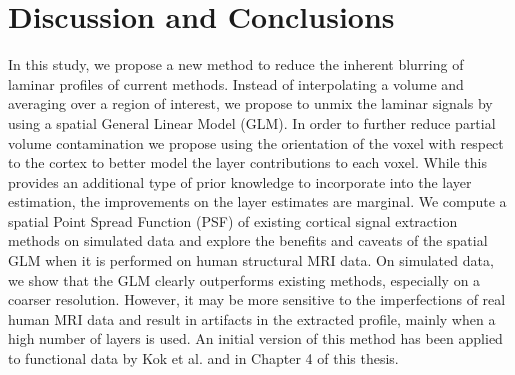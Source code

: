 \section{Discussion and Conclusions}
In this study, we propose a new method to reduce the inherent blurring of laminar profiles of current methods. Instead of interpolating a volume and averaging over a region of interest, we propose to unmix the laminar signals by using a spatial General Linear Model (GLM). In order to further reduce partial volume contamination we propose using the orientation of the voxel with respect to the cortex to better model the layer contributions to each voxel. While this provides an additional type of prior knowledge to incorporate into the layer estimation, the improvements on the layer estimates are marginal. We compute a spatial Point Spread Function (PSF) of existing cortical signal extraction methods on simulated data and explore the benefits and caveats of the spatial GLM when it is performed on human structural MRI data. On simulated data, we show that the GLM clearly outperforms existing methods, especially on a coarser resolution. However, it may be more sensitive to the imperfections of real human MRI data and result in artifacts in the extracted profile, mainly when a high number of layers is used. An initial version of this method has been applied to functional data by Kok et al. \cite{Kok2016} and in Chapter 4 of this thesis. %

